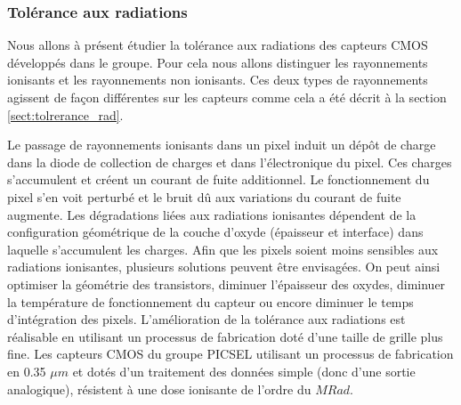    \subsubsection{Tol\'erance aux radiations}
   
   Nous allons \`a pr\'esent \'etudier la tol\'erance aux radiations des capteurs CMOS d\'eveloppés dans le groupe. Pour cela nous allons distinguer les rayonnements ionisants et les rayonnements non ionisants. Ces deux types de rayonnements agissent de fa\c{c}on diff\'erentes sur les capteurs comme cela a \'et\'e d\'ecrit \`a la section \ref{sect:tolrerance_rad}.
   
   \medskip
   
   Le passage de rayonnements ionisants dans un pixel induit un d\'ep\^ot de charge dans la diode de collection de charges et dans l'\'electronique du pixel. Ces charges s'accumulent et cr\'eent un courant de fuite additionnel. Le fonctionnement du pixel s'en voit perturb\'e et le bruit d\^u aux variations du courant de fuite augmente. Les dégradations li\'ees aux radiations ionisantes d\'ependent de la configuration g\'eom\'etrique de la couche d'oxyde (\'epaisseur et interface) dans laquelle s'accumulent les charges. Afin que les pixels soient moins sensibles aux radiations ionisantes, plusieurs solutions peuvent \^etre envisag\'ees. On peut ainsi optimiser la g\'eom\'etrie des transistors, diminuer l'\'epaisseur des oxydes, diminuer la temp\'erature de fonctionnement du capteur ou encore diminuer le temps d'int\'egration des pixels. L'am\'elioration de la tol\'erance aux radiations est r\'ealisable en utilisant un processus de fabrication dot\'e d'une taille de grille plus fine. Les capteurs CMOS du groupe PICSEL utilisant un processus de fabrication en 0.35 $\mu m$ et dot\'es d'un traitement des donn\'ees simple (donc d'une sortie analogique), r\'esistent \`a une dose ionisante de l'ordre du $MRad$. 
   
   \medskip
   

